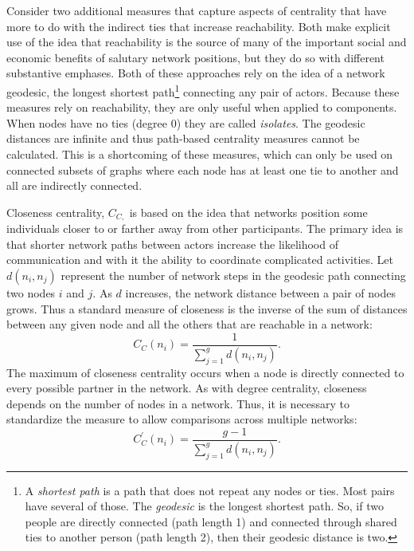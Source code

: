 \documentclass[]{krantz}
\begin{document}
Consider two additional measures that capture aspects of centrality that
have more to do with the indirect ties that increase reachability. Both
make explicit use of the idea that reachability is the source of many of
the important social and economic benefits of salutary network
positions, but they do so with different substantive emphases. Both of
these approaches rely on the idea of a network geodesic, the longest
shortest path\footnote{A \emph{shortest path} is a path that does not
  repeat any nodes or ties. Most pairs have several of those. The
  \emph{geodesic} is the longest shortest path. So, if two people are
  directly connected (path length 1) and connected through shared ties
  to another person (path length 2), then their geodesic distance is
  two.} connecting any pair of actors. Because these measures rely on
reachability, they are only useful when applied to components. When
nodes have no ties (degree 0) they are called \emph{isolates}. The
geodesic distances are infinite and thus path-based centrality measures
cannot be calculated. This is a shortcoming of these measures, which can
only be used on connected subsets of graphs where each node has at least
one tie to another and all are indirectly connected.

Closeness centrality, \(C_{C,}\) is based on the idea that networks
position some individuals closer to or farther away from other
participants. The primary idea is that shorter network paths between
actors increase the likelihood of communication and with it the ability
to coordinate complicated activities. Let \(d(n_{i}, n_{j})\) represent
the number of network steps in the geodesic path connecting two nodes
\(i\) and \(j\). As \(d\) increases, the network distance between a pair
of nodes grows. Thus a standard measure of closeness is the inverse of
the sum of distances between any given node and all the others that are
reachable in a network: \[C_C(n_i) = \frac{1}{\sum_{j=1}^gd(n_i,n_j)}.\]
The maximum of closeness centrality occurs when a node is directly
connected to every possible partner in the network. As with degree
centrality, closeness depends on the number of nodes in a network. Thus,
it is necessary to standardize the measure to allow comparisons across
multiple networks:
\[C_C^{\prime}(n_i)=\frac{g-1}{\sum_{j=1}^gd(n_i,n_j)}.\]
\end{document}
